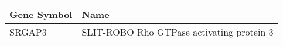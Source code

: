 \begin{tabular}{ll}
\toprule
Gene Symbol &                                      Name \\
\midrule
     SRGAP3 & SLIT-ROBO Rho GTPase activating protein 3 \\
\bottomrule
\end{tabular}
